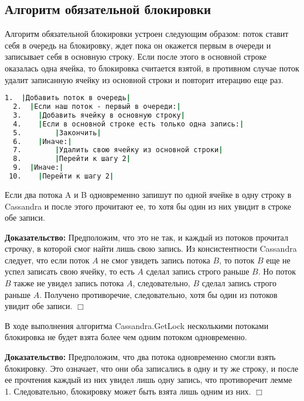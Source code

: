 \subsection{Алгоритм обязательной блокировки}

Алгоритм обязательной блокировки устроен следующим образом: поток ставит себя в очередь на блокировку, ждет пока он окажется первым в очереди и записывает себя в основную строку. Если после этого в основной строке оказалась одна ячейка, то блокировка считается взятой, в противном случае поток удалит записанную ячейку из основной строки и повторит итерацию еще раз.

\begin{lstlisting}[language=csh,caption={Алгоритм Cassandra.GetLock(lockId, threadId)}]
  1.  |Добавить поток в очередь|
  2.  |Если наш поток - первый в очереди:|
  3.  	|Добавить ячейку в основную строку|
  4.  	|Если в основной строке есть только одна запись:|
  5.  		|Закончить|
  6.  	|Иначе:|
  7.  		|Удалить свою ячейку из основной строки|
  8.  		|Перейти к шагу 2|
  9.  |Иначе:|
 10.  	|Перейти к шагу 2|

\end{lstlisting}

\begin{lemma}
Если два потока A и B одновременно запишут по одной ячейке в одну строку в Cassandra и после этого прочитают ее, то хотя бы один из них увидит в строке обе записи.
\end{lemma}
\textbf{Доказательство:}
Предположим, что это не так, и каждый из потоков прочитал строчку, в которой смог найти лишь свою запись. Из консистентности Cassandra следует, что если поток $A$ не смог увидеть запись потока $B$, то поток $B$ еще не успел записать свою ячейку, то есть $A$ сделал запись строго раньше $B$. Но поток $B$ также не увидел запись потока $A$, следовательно, $B$ сделал запись строго раньше $A$. Получено противоречие, следовательно, хотя бы один из потоков увидит обе записи.
$\Box$

\begin{theorem}
В ходе выполнения алгоритма Cassandra.GetLock несколькими потоками блокировка не будет взята более чем одним потоком одновременно.
\end{theorem}
\textbf{Доказательство:}
Предположим, что два потока одновременно смогли взять блокировку. Это означает, что они оба записались в одну и ту же строку, и после ее прочтения каждый из них увидел лишь одну запись, что противоречит лемме 1. Следовательно, блокировку может быть взята лишь одним из них.
$\Box$

